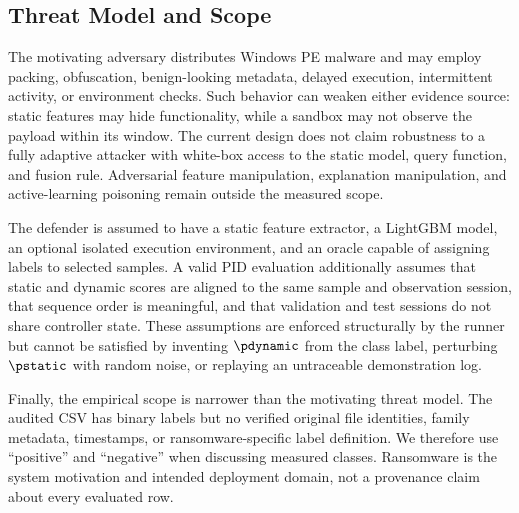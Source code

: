 \subsection{Threat Model and Scope}

The motivating adversary distributes Windows PE malware and may employ packing,
obfuscation, benign-looking metadata, delayed execution, intermittent activity,
or environment checks. Such behavior can weaken either evidence source: static
features may hide functionality, while a sandbox may not observe the payload
within its window. The current design does not claim robustness to a fully
adaptive attacker with white-box access to the static model, query function, and
fusion rule. Adversarial feature manipulation, explanation manipulation, and
active-learning poisoning remain outside the measured scope.

The defender is assumed to have a static feature extractor, a LightGBM model, an
optional isolated execution environment, and an oracle capable of assigning
labels to selected samples. A valid PID evaluation additionally assumes that
static and dynamic scores are aligned to the same sample and observation session,
that sequence order is meaningful, and that validation and test sessions do not
share controller state. These assumptions are enforced structurally by the
runner but cannot be satisfied by inventing $\pdynamic$ from the class label,
perturbing $\pstatic$ with random noise, or replaying an untraceable demonstration
log.

Finally, the empirical scope is narrower than the motivating threat model. The
audited CSV has binary labels but no verified original file identities, family
metadata, timestamps, or ransomware-specific label definition. We therefore use
``positive'' and ``negative'' when discussing measured classes. Ransomware is the
system motivation and intended deployment domain, not a provenance claim about
every evaluated row.
